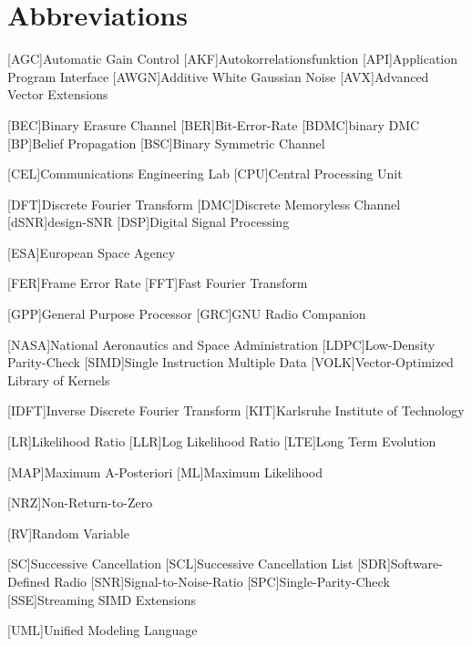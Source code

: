 \chapter{Abbreviations}
\begin{acronym}[TROLL]
  [AGC]{Automatic Gain Control}
  [AKF]{Autokorrelationsfunktion}
  [API]{Application Program Interface}
  [AWGN]{Additive White Gaussian Noise}
  [AVX]{Advanced Vector Extensions}
  
  [BEC]{Binary Erasure Channel}
  [BER]{Bit-Error-Rate}
  [BDMC]{binary \acs{DMC}}
  [BP]{Belief Propagation}
  [BSC]{Binary Symmetric Channel}
  
  [CEL]{Communications Engineering Lab}
  [CPU]{Central Processing Unit}

  [DFT]{Discrete Fourier Transform}
  [DMC]{Discrete Memoryless Channel}
  [dSNR]{design-\ac{SNR}}
  [DSP]{Digital Signal Processing}
 
  [ESA]{European Space Agency}

  [FER]{Frame Error Rate}
  [FFT]{Fast Fourier Transform}
  
  [GPP]{General Purpose Processor}
  [GRC]{GNU Radio Companion}
  
  [NASA]{National Aeronautics and Space Administration}
  [LDPC]{Low-Density Parity-Check}
  [SIMD]{Single Instruction Multiple Data}
  [VOLK]{Vector-Optimized Library of Kernels}

  [IDFT]{Inverse Discrete Fourier Transform}
  [KIT]{Karlsruhe Institute of Technology}

  [LR]{Likelihood Ratio}
  [LLR]{Log Likelihood Ratio}
  [LTE]{Long Term Evolution}
 
  [MAP]{Maximum A-Posteriori}
  [ML]{Maximum Likelihood}
 
  [NRZ]{Non-Return-to-Zero}
 
  [RV]{Random Variable}
 
  [SC]{Successive Cancellation}
  [SCL]{Successive Cancellation List}
  [SDR]{Software-Defined Radio}
  [SNR]{Signal-to-Noise-Ratio}
  [SPC]{Single-Parity-Check}
  [SSE]{Streaming SIMD Extensions}

 [UML]{Unified Modeling Language}
\end{acronym}
